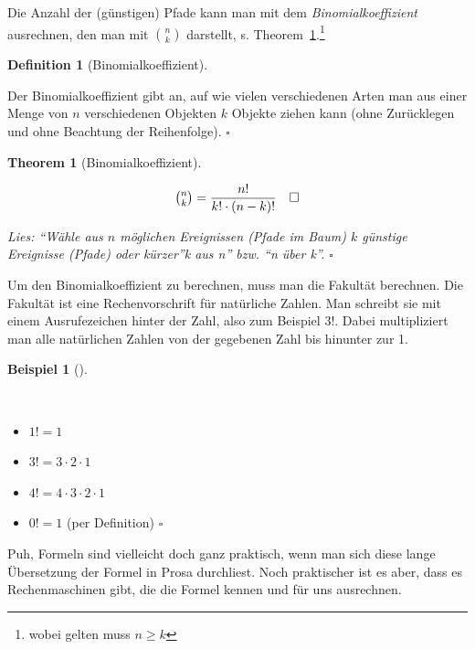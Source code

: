 \documentclass[
  ngerman,
  letterpaper,
  twoside,
  open=any]{scrbook}
\providecommand{\tightlist}{%
  \setlength{\itemsep}{0pt}\setlength{\parskip}{0pt}}\usepackage{longtable,booktabs,array}
\theoremstyle{definition}
\newtheorem{example}{Beispiel}[chapter]
\theoremstyle{plain}
\newtheorem{theorem}{Theorem}[chapter]
\theoremstyle{definition}
\theoremstyle{definition}
\newtheorem{definition}{Definition}[chapter]
\theoremstyle{definition}
\newtheorem{example}{Beispiel}[chapter]
\theoremstyle{definition}
\theoremstyle{remark}
\begin{document}
Die Anzahl der (günstigen) Pfade kann man mit dem
\emph{Binomialkoeffizient} ausrechnen, den man mit \(\binom{n}{k}\)
darstellt, s. Theorem~\ref{thm-binkoeff}.\footnote{wobei gelten muss
  \(n \ge k\)}

\begin{definition}[Binomialkoeffizient]\protect\hypertarget{def-binkoeff}{}\label{def-binkoeff}

Der Binomialkoeffizient gibt an, auf wie vielen verschiedenen Arten man
aus einer Menge von \(n\) verschiedenen Objekten \(k\) Objekte ziehen
kann (ohne Zurücklegen und ohne Beachtung der Reihenfolge). \(\square\)

\end{definition}

\begin{theorem}[Binomialkoeffizient]\protect\hypertarget{thm-binkoeff}{}\label{thm-binkoeff}

\[\tbinom{n}{k}= \frac{n!}{k!\cdot (n-k)!} \quad \square\]

Lies: \enquote{Wähle aus \(n\) möglichen Ereignissen (Pfade im Baum)
\(k\) günstige Ereignisse (Pfade) oder kürzer}k aus n'' bzw. \enquote{n
über k}. \(\square\)

\end{theorem}

Um den Binomialkoeffizient zu berechnen, muss man die Fakultät
berechnen. Die Fakultät ist eine Rechenvorschrift für natürliche Zahlen.
Man schreibt sie mit einem Ausrufezeichen hinter der Zahl, also zum
Beispiel \(3!\). Dabei multipliziert man alle natürlichen Zahlen von der
gegebenen Zahl bis hinunter zur 1.

\begin{example}[]\protect\hypertarget{exm-fakultaet}{}\label{exm-fakultaet}

~

\begin{itemize}
\tightlist
\item
  \(1! = 1\)
\item
  \(3! = 3 \cdot 2 \cdot 1\)
\item
  \(4! = 4 \cdot 3 \cdot 2 \cdot 1\)
\item
  \(0! = 1\) (per Definition) \(\square\)
\end{itemize}

\end{example}

Puh, Formeln sind vielleicht doch ganz praktisch, wenn man sich diese
lange Übersetzung der Formel in Prosa durchliest. Noch praktischer ist
es aber, dass es Rechenmaschinen gibt, die die Formel kennen und für uns
ausrechnen.
\end{document}
